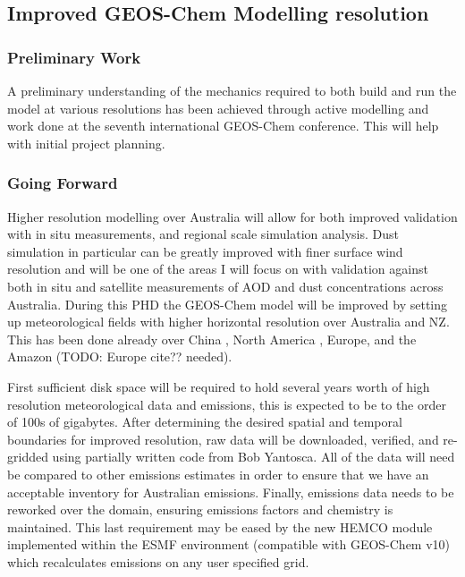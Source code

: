 \subsection{Improved GEOS-Chem Modelling resolution}
\subsubsection{Preliminary Work}
A preliminary understanding of the mechanics required to both build and run the model at various resolutions has been achieved through active modelling and work done at the seventh international GEOS-Chem conference.
This will help with initial project planning.

\subsubsection{Going Forward}
Higher resolution modelling over Australia will allow for both improved validation with in situ measurements, and regional scale simulation analysis. 
Dust simulation in particular can be greatly improved with finer surface wind resolution and will be one of the areas I will focus on with validation against both in situ and satellite measurements of AOD and dust concentrations across Australia.
During this PHD the GEOS-Chem model will be improved by setting up meteorological fields with higher horizontal resolution over Australia and NZ.
This has been done already over China \cite{Chen_2009,Wang_2004}, North America \cite{Zhang_2012}, Europe, and the Amazon (TODO: Europe cite?? needed).

First sufficient disk space will be required to hold several years worth of high resolution meteorological data and emissions, this is expected to be to the order of 100s of gigabytes.
After determining the desired spatial and temporal boundaries for improved resolution, raw data will be downloaded, verified, and re-gridded using partially written code from Bob Yantosca.
All of the data will need be compared to other emissions estimates in order to ensure that we have an acceptable inventory for Australian emissions.
Finally, emissions data needs to be reworked over the domain, ensuring emissions factors and chemistry is maintained.
This last requirement may be eased by the new HEMCO module implemented within the ESMF environment (compatible with GEOS-Chem v10) which recalculates emissions on any user specified grid.
  